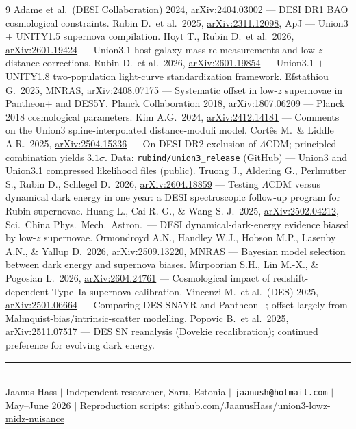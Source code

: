 \documentclass[11pt]{article}
\begin{document}
\begin{thebibliography}{9}
\small
{} Adame et al.\ (DESI Collaboration) 2024,
\href{https://arxiv.org/abs/2404.03002}{arXiv:2404.03002} --- DESI DR1 BAO cosmological constraints.
 Rubin D.\ et al.\ 2025,
\href{https://arxiv.org/abs/2311.12098}{arXiv:2311.12098}, ApJ --- Union3 $+$ UNITY1.5 supernova compilation.
 Hoyt T., Rubin D.\ et al.\ 2026,
\href{https://arxiv.org/abs/2601.19424}{arXiv:2601.19424} --- Union3.1 host-galaxy mass re-measurements and low-$z$ distance corrections.
 Rubin D.\ et al.\ 2026,
\href{https://arxiv.org/abs/2601.19854}{arXiv:2601.19854} --- Union3.1 $+$ UNITY1.8 two-population light-curve standardization framework.
 Efstathiou G.\ 2025, MNRAS, \href{https://arxiv.org/abs/2408.07175}{arXiv:2408.07175} --- Systematic offset in low-$z$ supernovae in Pantheon$+$ and DES5Y.
 Planck Collaboration 2018,
\href{https://arxiv.org/abs/1807.06209}{arXiv:1807.06209} --- Planck 2018 cosmological parameters.
 Kim A.G.\ 2024,
\href{https://arxiv.org/abs/2412.14181}{arXiv:2412.14181} --- Comments on the Union3 spline-interpolated distance-moduli model.
 Cort\^es M.\ \& Liddle A.R.\ 2025,
\href{https://arxiv.org/abs/2504.15336}{arXiv:2504.15336} --- On DESI DR2 exclusion of $\Lambda$CDM; principled combination yields $3.1\sigma$.
 Data: \texttt{rubind/union3\_release} (GitHub) --- Union3 and Union3.1 compressed likelihood files (public).
 Truong J., Aldering G., Perlmutter S., Rubin D., Schlegel D.\ 2026,
\href{https://arxiv.org/abs/2604.18859}{arXiv:2604.18859} --- Testing $\Lambda$CDM versus dynamical dark energy in one year: a DESI spectroscopic follow-up program for Rubin supernovae.
 Huang L., Cai R.-G., \& Wang S.-J.\ 2025,
\href{https://arxiv.org/abs/2502.04212}{arXiv:2502.04212}, Sci.\ China Phys.\ Mech.\ Astron.\ --- DESI dynamical-dark-energy evidence biased by low-$z$ supernovae.
 Ormondroyd A.N., Handley W.J., Hobson M.P., Lasenby A.N., \& Yallup D.\ 2026,
\href{https://arxiv.org/abs/2509.13220}{arXiv:2509.13220}, MNRAS --- Bayesian model selection between dark energy and supernova biases.
 Mirpoorian S.H., Lin M.-X., \& Pogosian L.\ 2026,
\href{https://arxiv.org/abs/2604.24761}{arXiv:2604.24761} --- Cosmological impact of redshift-dependent Type~Ia supernova calibration.
 Vincenzi M.\ et al.\ (DES) 2025,
\href{https://arxiv.org/abs/2501.06664}{arXiv:2501.06664} --- Comparing DES-SN5YR and Pantheon$+$; offset largely from Malmquist-bias/intrinsic-scatter modelling.
 Popovic B.\ et al.\ 2025,
\href{https://arxiv.org/abs/2511.07517}{arXiv:2511.07517} --- DES SN reanalysis (Dovekie recalibration); continued preference for evolving dark energy.
\end{thebibliography}

\vspace{1em}
\noindent\rule{\textwidth}{0.4pt}\\
\small Jaanus Hass $|$ Independent researcher, Saru, Estonia $|$ \texttt{jaanush@hotmail.com} $|$
May--June 2026 $|$ Reproduction scripts:
\href{https://github.com/JaanusHass/union3-lowz-midz-nuisance}{github.com/JaanusHass/union3-lowz-midz-nuisance}
\end{document}
